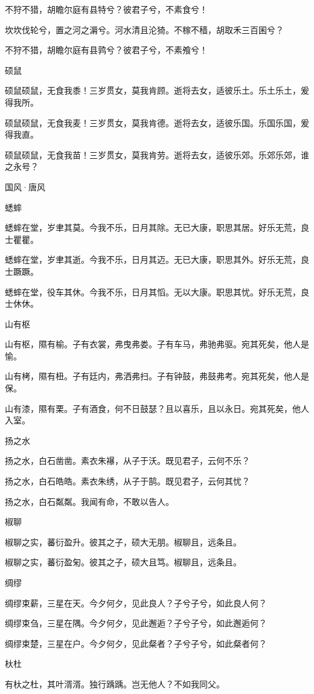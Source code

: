 不狩不猎，胡瞻尔庭有县特兮？彼君子兮，不素食兮！

坎坎伐轮兮，置之河之漘兮。河水清且沦猗。不稼不穑，胡取禾三百囷兮？

不狩不猎，胡瞻尔庭有县鹑兮？彼君子兮，不素飧兮！

硕鼠

硕鼠硕鼠，无食我黍！三岁贯女，莫我肯顾。逝将去女，适彼乐土。乐土乐土，爰得我所。

硕鼠硕鼠，无食我麦！三岁贯女，莫我肯德。逝将去女，适彼乐国。乐国乐国，爰得我直。

硕鼠硕鼠，无食我苗！三岁贯女，莫我肯劳。逝将去女，适彼乐郊。乐郊乐郊，谁之永号？




国风·唐风


蟋蟀

蟋蟀在堂，岁聿其莫。今我不乐，日月其除。无已大康，职思其居。好乐无荒，良士瞿瞿。

蟋蟀在堂，岁聿其逝。今我不乐，日月其迈。无已大康，职思其外。好乐无荒，良士蹶蹶。

蟋蟀在堂，役车其休。今我不乐，日月其慆。无以大康。职思其忧。好乐无荒，良士休休。

山有枢

山有枢，隰有榆。子有衣裳，弗曳弗娄。子有车马，弗驰弗驱。宛其死矣，他人是愉。

山有栲，隰有杻。子有廷内，弗洒弗扫。子有钟鼓，弗鼓弗考。宛其死矣，他人是保。

山有漆，隰有栗。子有酒食，何不日鼓瑟？且以喜乐，且以永日。宛其死矣，他人入室。

扬之水

扬之水，白石凿凿。素衣朱襮，从子于沃。既见君子，云何不乐？

扬之水，白石皓皓。素衣朱绣，从子于鹄。既见君子，云何其忧？

扬之水，白石粼粼。我闻有命，不敢以告人。

椒聊

椒聊之实，蕃衍盈升。彼其之子，硕大无朋。椒聊且，远条且。

椒聊之实，蕃衍盈匊。彼其之子，硕大且笃。椒聊且，远条且。

绸缪

绸缪束薪，三星在天。今夕何夕，见此良人？子兮子兮，如此良人何？

绸缪束刍，三星在隅。今夕何夕，见此邂逅？子兮子兮，如此邂逅何？

绸缪束楚，三星在户。今夕何夕，见此粲者？子兮子兮，如此粲者何？

杕杜

有杕之杜，其叶湑湑。独行踽踽。岂无他人？不如我同父。


